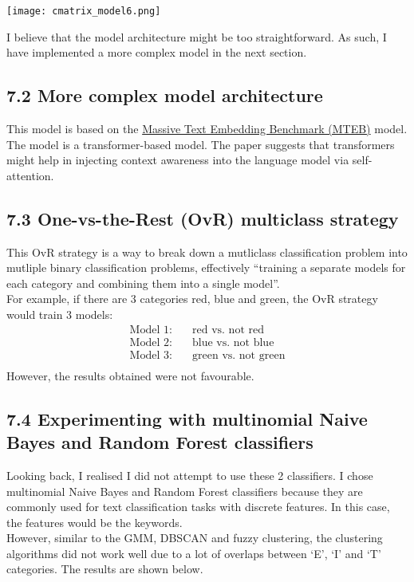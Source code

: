 \texttt{[image: cmatrix\_model6.png]}

I believe that the model architecture might be too straightforward. As such, I have implemented a more complex model in the next section.

\subsection*{7.2 More complex model architecture}
This model is based on the \href{https://arxiv.org/pdf/2210.07316.pdf}{Massive Text Embedding Benchmark (MTEB)} model. The model is a transformer-based model. The paper suggests that transformers might help in injecting context awareness into the language model via self-attention.

\subsection*{7.3 One-vs-the-Rest (OvR) multiclass strategy}
This OvR strategy is a way to break down a mutliclass classification problem into mutliple binary classification problems, effectively ``training a separate models for each category and combining them into a single model''. \\
For example, if there are 3 categories red, blue and green, the OvR strategy would train 3 models: \\
\begin{align*}
    \text{Model 1:} \quad & \text{red vs. not red} \\
    \text{Model 2:} \quad & \text{blue vs. not blue} \\
    \text{Model 3:} \quad & \text{green vs. not green} \\
\end{align*}
However, the results obtained were not favourable.


\subsection*{7.4 Experimenting with multinomial Naive Bayes and Random Forest classifiers}
Looking back, I realised I did not attempt to use these 2 classifiers. I chose multinomial Naive Bayes and Random Forest classifiers because they are commonly used for text classification tasks with discrete features. In this case, the features would be the keywords. \\
However, similar to the GMM, DBSCAN and fuzzy clustering, the clustering algorithms did not work well due to a lot of overlaps between `E', `I' and `T' categories. The results are shown below.\\

